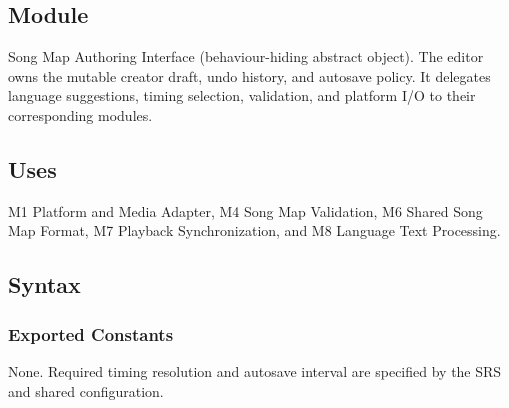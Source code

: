 \documentclass[12pt, titlepage]{article}
\begin{document}
\subsection{Module}
Song Map Authoring Interface (behaviour-hiding abstract object).
The editor owns the mutable creator draft, undo history, and
autosave policy. It delegates language suggestions, timing selection,
validation, and platform I/O to their corresponding modules.

\subsection{Uses}
M1 Platform and Media Adapter, M4 Song Map Validation,
M6 Shared Song Map Format, M7 Playback Synchronization, and
M8 Language Text Processing.

\subsection{Syntax}
\subsubsection{Exported Constants}
None. Required timing resolution and autosave interval are
specified by the SRS and shared configuration.
\end{document}
